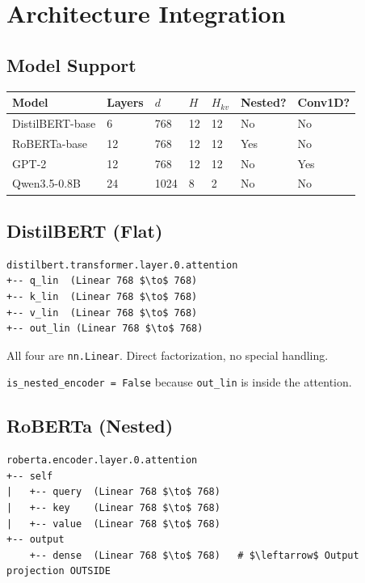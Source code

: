 
\section{Architecture Integration}

\subsection{Model Support}

\begin{table}[H]
\centering
\small
\begin{tabular}{lllllll}
\toprule
\textbf{Model} & \textbf{Layers} & \textbf{$d$} & \textbf{$H$} & \textbf{$H_{kv}$} & \textbf{Nested?} & \textbf{Conv1D?} \\
\midrule
DistilBERT-base & 6 & 768 & 12 & 12 & No & No \\
RoBERTa-base & 12 & 768 & 12 & 12 & Yes & No \\
GPT-2 & 12 & 768 & 12 & 12 & No & Yes \\
Qwen3.5-0.8B & 24 & 1024 & 8 & 2 & No & No \\
\bottomrule
\end{tabular}
\end{table}

\subsection{DistilBERT (Flat)}

\begin{lstlisting}
distilbert.transformer.layer.0.attention
+-- q_lin  (Linear 768 $\to$ 768)
+-- k_lin  (Linear 768 $\to$ 768)
+-- v_lin  (Linear 768 $\to$ 768)
+-- out_lin (Linear 768 $\to$ 768)
\end{lstlisting}

All four are \texttt{nn.Linear}. Direct factorization, no special handling.

\texttt{is\_nested\_encoder = False} because \texttt{out\_lin} is inside the attention.

\subsection{RoBERTa (Nested)}

\begin{lstlisting}
roberta.encoder.layer.0.attention
+-- self
|   +-- query  (Linear 768 $\to$ 768)
|   +-- key    (Linear 768 $\to$ 768)
|   +-- value  (Linear 768 $\to$ 768)
+-- output
    +-- dense  (Linear 768 $\to$ 768)   # $\leftarrow$ Output projection OUTSIDE
\end{lstlisting}

